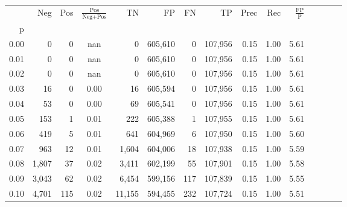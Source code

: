 \begin{tabular}{rrrcrrrrrrrrrrr}
\toprule
{} &     Neg &    Pos & $\frac{\text{Pos}}{\text{Neg}+\text{Pos}}$ &       TN &       FP &       FN &       TP &  Prec &   Rec & $\frac{\text{FP}}{\text{P}}$ \\
p    &         &        &                                            &          &          &          &          &       &       &                              \\
\midrule
0.00 &       0 &      0 &                                        nan &        0 &  605,610 &        0 &  107,956 &  0.15 &  1.00 &                         5.61 \\
0.01 &       0 &      0 &                                        nan &        0 &  605,610 &        0 &  107,956 &  0.15 &  1.00 &                         5.61 \\
0.02 &       0 &      0 &                                        nan &        0 &  605,610 &        0 &  107,956 &  0.15 &  1.00 &                         5.61 \\
0.03 &      16 &      0 &                                       0.00 &       16 &  605,594 &        0 &  107,956 &  0.15 &  1.00 &                         5.61 \\
0.04 &      53 &      0 &                                       0.00 &       69 &  605,541 &        0 &  107,956 &  0.15 &  1.00 &                         5.61 \\
0.05 &     153 &      1 &                                       0.01 &      222 &  605,388 &        1 &  107,955 &  0.15 &  1.00 &                         5.61 \\
0.06 &     419 &      5 &                                       0.01 &      641 &  604,969 &        6 &  107,950 &  0.15 &  1.00 &                         5.60 \\
0.07 &     963 &     12 &                                       0.01 &    1,604 &  604,006 &       18 &  107,938 &  0.15 &  1.00 &                         5.59 \\
0.08 &   1,807 &     37 &                                       0.02 &    3,411 &  602,199 &       55 &  107,901 &  0.15 &  1.00 &                         5.58 \\
0.09 &   3,043 &     62 &                                       0.02 &    6,454 &  599,156 &      117 &  107,839 &  0.15 &  1.00 &                         5.55 \\
0.10 &   4,701 &    115 &                                       0.02 &   11,155 &  594,455 &      232 &  107,724 &  0.15 &  1.00 &                         5.51 \\

\end{tabular}
